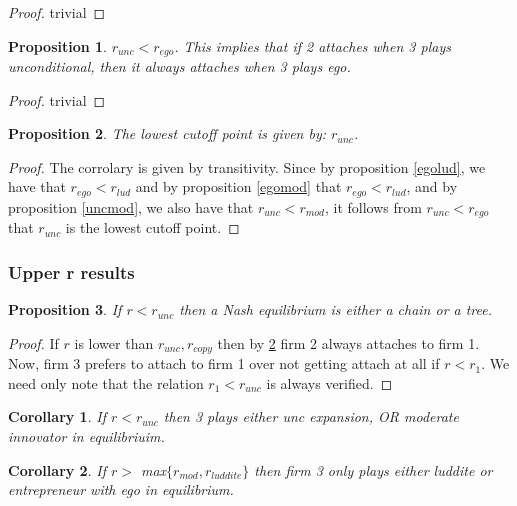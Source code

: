 \documentclass{article}
\newtheorem{corollary}{Corollary}
\newtheorem{proposition}{Proposition}
\begin{document}
\begin{proof}
trivial
\end{proof}

\begin{proposition}\label{uncego}
$r_{unc}<r_{ego}$. This implies that if 2 attaches when 3 plays unconditional, then it always attaches when 3 plays ego.  
\end{proposition}

\begin{proof}
trivial
\end{proof}

\begin{proposition}\label{minr}
The lowest cutoff point is given by: 
$r_{unc}$. 
\end{proposition}

\begin{proof}
The corrolary is given by transitivity. Since by proposition \ref{egolud}, we have that $r_{ego}<r_{lud}$ and by proposition \ref{egomod} that $r_{ego}<r_{lud}$, and by proposition \ref{uncmod}, we also have that $r_{unc}<r_{mod}$, it follows from $r_{unc}<r_{ego}$ that $r_{unc}$ is the lowest cutoff point. 
\end{proof}



\subsubsection{Upper r results}

\begin{proposition}
If  $r<  r_{unc}$ then a Nash equilibrium is either a chain or a tree.
\end{proposition}

\begin{proof}
If $r$ is lower than $   r_{unc}, r_{copy} $ then by \ref{minr} firm 2 always attaches to firm 1. Now, firm 3 prefers to attach to firm 1 over not getting attach at all if $r<r_1$. We need only note that the relation $r_1<r_{unc}$ is always verified.  
\end{proof}


\begin{corollary}
If $r<  r_{unc}$ then 3 plays either unc expansion, OR moderate innovator in equilibriuim.
\end{corollary}

\begin{corollary}
If $r>$ max$\{ r_{mod},r_{luddite} \}$ then firm 3 only plays either luddite or entrepreneur with ego in equilibrium. 
\end{corollary}
\end{document}
